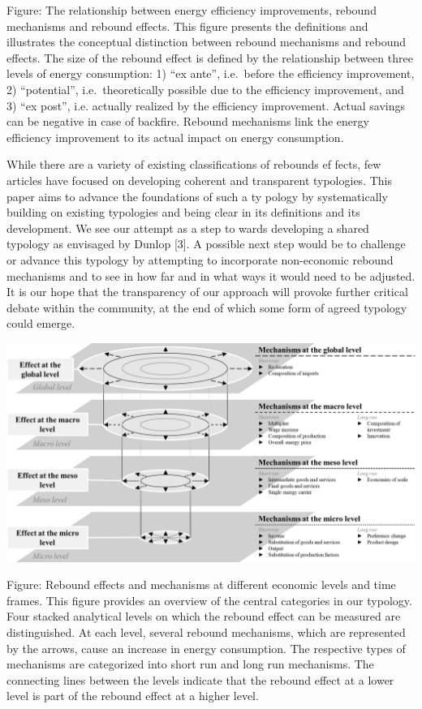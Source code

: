 \documentclass[
]{book}
\begin{document}
Figure: The relationship between energy efficiency improvements, rebound mechanisms and rebound effects. This figure presents the definitions and illustrates the
conceptual distinction between rebound mechanisms and rebound effects. The size of the rebound effect is defined by the relationship between three levels of energy
consumption: 1) ``ex ante'', i.e.~before the efficiency improvement, 2) ``potential'', i.e.~theoretically possible due to the efficiency improvement, and 3) ``ex post'', i.e.
actually realized by the efficiency improvement. Actual savings can be negative in case of backfire. Rebound mechanisms link the energy efficiency improvement to
its actual impact on energy consumption.

While there are a variety of existing classifications of rebounds ef­
fects, few articles have focused on developing coherent and transparent
typologies. This paper aims to advance the foundations of such a ty­
pology by systematically building on existing typologies and being clear
in its definitions and its development. We see our attempt as a step to­
wards developing a shared typology as envisaged by Dunlop {[}3{]}. A
possible next step would be to challenge or advance this typology by
attempting to incorporate non-economic rebound mechanisms and to
see in how far and in what ways it would need to be adjusted. It is our
hope that the transparency of our approach will provoke further critical
debate within the community, at the end of which some form of agreed
typology could emerge.

\includegraphics{fig/lange_rebound_levels.png}

Figure: Rebound effects and mechanisms at different economic levels and time frames. This figure provides an overview of the central categories in our typology.
Four stacked analytical levels on which the rebound effect can be measured are distinguished. At each level, several rebound mechanisms, which are represented by
the arrows, cause an increase in energy consumption. The respective types of mechanisms are categorized into short run and long run mechanisms. The connecting
lines between the levels indicate that the rebound effect at a lower level is part of the rebound effect at a higher level.
\end{document}
